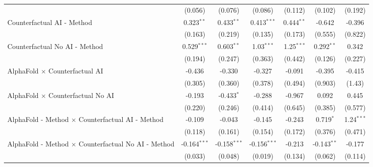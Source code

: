 \begin{tabular}{lcccccc}
                                                              & (0.056)        & (0.076)        & (0.086)        & (0.112)       & (0.102)       & (0.192)\\   
   Counterfactual AI - Method                                 & 0.323$^{**}$   & 0.433$^{**}$   & 0.413$^{***}$  & 0.444$^{**}$  & -0.642        & -0.396\\   
                                                              & (0.163)        & (0.219)        & (0.135)        & (0.173)       & (0.555)       & (0.822)\\   
   Counterfactual No AI - Method                              & 0.529$^{***}$  & 0.603$^{**}$   & 1.03$^{***}$   & 1.25$^{***}$  & 0.292$^{**}$  & 0.342\\   
                                                              & (0.194)        & (0.247)        & (0.363)        & (0.442)       & (0.126)       & (0.227)\\   
   AlphaFold $\times$ Counterfactual AI                       & -0.436         & -0.330         & -0.327         & -0.091        & -0.395        & -0.415\\   
                                                              & (0.305)        & (0.360)        & (0.378)        & (0.494)       & (0.903)       & (1.43)\\   
   AlphaFold $\times$ Counterfactual No AI                    & -0.193         & -0.433$^{*}$   & -0.288         & -0.967        & 0.092         & 0.445\\   
                                                              & (0.220)        & (0.246)        & (0.414)        & (0.645)       & (0.385)       & (0.577)\\   
   AlphaFold - Method $\times$ Counterfactual AI - Method     & -0.109         & -0.043         & -0.145         & -0.243        & 0.719$^{*}$   & 1.24$^{***}$\\   
                                                              & (0.118)        & (0.161)        & (0.154)        & (0.172)       & (0.376)       & (0.471)\\   
   AlphaFold - Method $\times$ Counterfactual No AI - Method  & -0.164$^{***}$ & -0.158$^{***}$ & -0.156$^{***}$ & -0.213        & -0.143$^{**}$ & -0.177\\   
                                                              & (0.033)        & (0.048)        & (0.019)        & (0.134)       & (0.062)       & (0.114)\\   
   \midrule

\end{tabular}
